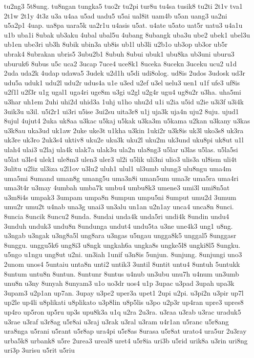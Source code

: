 {tu2ng3 5t8ung. tu8ngan tungka5 tuo2r tu2pi tur8u tu4sa tusik8 tu2ti 2t1v
tva1 2t1w 2t1y 4t3z u3a u4aa u5ad uadu5 u5ai ual8it uam4b u5an uang3 ua2ni
u5a2p1 4uap. ua8pa uara5k ua2r1u u4asis u5at. u4ate u5ato uat5r uatu3
u4a1u u1b uba1i 8ubak ub3aku 4ubal ubal5u 4ubang 8ubangk uba3u ube2 ubek1
ubel3u ub1en ube3ri ub3h 8ubik ubin3a ub8is ub1l ub3li u2b1o ub3op ub3or
ub5r ubrak4 8ubrakan ubris5 3ubu2b1 8ubuh 8ubui ubuk1 ubu8ka ub3uni uburu3
uburuk6 8ubus u5c uca2 3ucap 7uce4 uce8k1 8uceka 8ucekn 3uceku ucu2 u1d
2uda uda2k 4udap udawa5 3udek u2d1h u5di udi8olog. ud8is 2udos 3udosk ud3r
udu5a uduk1 udu2l udu2r udus4a u1e u3ed u2ef u3el uelu3 uen1 u1f ufe3
uf8is u2f1l u2f3r u1g ugal1 uga4ri uge8m u3gi u2gl u2g4r ugu4 ug8u2r u3ha.
uha5mi u3har uh1em 2uhi uhi2d uhid3a 1uhj u1ho uhu2d u1i u2ia u5id u2ie
u3i3f u3i4k 3uik3u u3il. u5i2r1 ui3ri u5ise 3ui2su uita3r8 u1j uja3k uja4n
uju2 8uju. ujud1 8ujul 4ujut4 2uka uk8aa u3kac u5kaj u5kak u3ka3m u5kama
u2kan u3kany u3kas u3k8au uka3ud uk1aw 2uke uke3t u1kha u3kin 1uki2r
u3k8is uk3l uko3s8 uk3ra uk3re uk3ro 2uk3s4 uktiv8 uku2e uku3k uku2l uku2m
uk3und uku8pi uk8ut u1l ulah4 ulai3 u2laj ula4k ulak7a ulak3u ula2n
ula8ng3 u5lar u3las u5las. u5la5si u5lat u3le4 ulek1 ule8m3 ulen3 uler3
ul2i u5lik uli3ni ulio3 ulis3a ul8ism uli4t 3ulitu u2liz ul3iza u2l1ov
u3lu2 uluh1 ulul1 ul3umb ulung3 ulu8ngu uma4m uma5mi 8umand uman8g umang5u
uma3n8i uman5um uma3r uma5ra uma4ri uma3t4r u3may 4umbah umba7k umbu4
umbu8k3 umene3 umi3l umi8n5at u3m8i4s umpak3 3umpam umpa8n 8umpun umpu5ni
8umput umu2d 3umum umu2r umu2t u4nab una3g unai3 un3alu un1an u2n1ay unca4
unca8n 8unci. 8uncia 8uncik 8uncu2 8unda. 8undai unda4k unda5ri undi4k
8undin undu4 3unduh unduk3 undu8n 8undunga undut4 undu5ta u3ne une4k3 ung1
u8ng. u3ngab u3ngak u3ng8a5l ung8ara u3ngas u5ngau ungga8k5 unggal5
8unggasr 8unggu. unggu5k6 ung8i3 u8ngk ungkah6a ungka8s ungke5l8 ungki8l5
8ungku. u5ngo u1ngu ung8ut u2ni. un3iah 1unif u3n8is 5unjun. 8unjung.
8unjungi uno3 2unom unos4 5untaiu unta8n unti2 untik3 3until 8untit untu4
8untuh 5untukk 8untum untu8n 8untun. 8untunr 8untus u4nub un3ubu unu7h
u4num un3umb unu8n u3ny 8unyah 8unyam3 u1o uo3dr uos4 u1p 3upac u3pad
3upah upa3k 3upam3 u2p1an up7an. 3upay u3pe2 uper3a upet1 2upi u2pi.
u3pi2n u3pir up7l up2le up4li u8plikati u8plikato u3p8lin u8p5lis u3po
u2p3r up4ran upre3 upres8 up4ro up5ron up5ru up3s upu8k3a u1q u2ra 2u3ra.
u3raa u3rab u3rac uraduk5 u3rae u3raf u3r8ag u5r8ai u3raj u3rak u3ral
u3ram u4r1an u5ranc u5r8ang ura8nga u5rani u5rant u5r8ap ura4pi u5r8as
8urasa u5r8at urato4 ura5ur 2u3ray urba5k8 urbank8 u5re 2urea3 ureal8
uret4 u5r8ia uri3b u5rid urik8a u3rin uri8ng uri3p 3urisu u5rit u5riu
}
